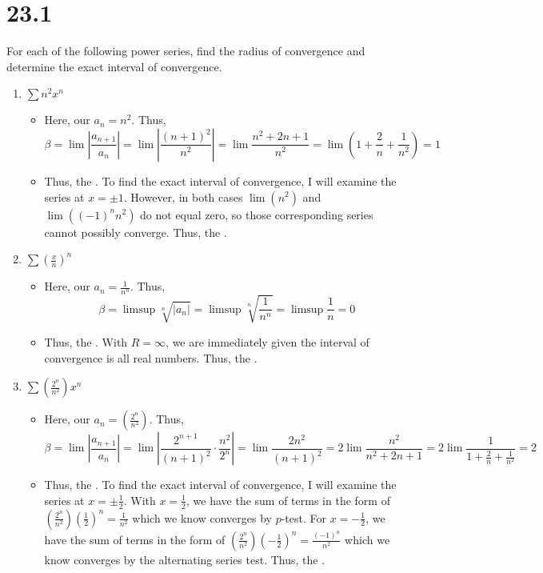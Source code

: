 \documentclass[10pt,a4paper]{article}
\theoremstyle{definition}
\begin{document}
\section*{23.1}
For each of the following power series, find the radius of convergence and determine the exact interval of convergence.
\begin{enumerate}[label = (\alph*)]
\item $\displaystyle \sum n^2x^n$
	\begin{itemize}
	\item Here, our $a_n = n^2$. Thus,
	\[\beta = \lim \left|\frac{a_{n+1}}{a_n}\right| = \lim \left|\frac{(n+1)^2}{n^2}\right| = \lim \frac{n^2 + 2n + 1}{n^2} = \lim \left(1 + \frac{2}{n} + \frac{1}{n^2}\right) = 1\]
	\item Thus, the . To find the exact interval of convergence, I will examine the series at $x = \pm 1$. However, in both cases $\lim(n^2)$ and $\lim((-1)^nn^2)$ do not equal zero, so those corresponding series cannot possibly converge. Thus, the .
	\end{itemize}
\item $\displaystyle \sum \left(\frac{x}{n}\right)^n$
	\begin{itemize}
	\item Here, our $a_n = \frac{1}{n^n}$. Thus,
	\[\beta = \limsup \sqrt[n]{|a_n|} = \limsup \sqrt[n]{\frac{1}{n^n}} = \limsup \frac{1}{n} = 0\]
	\item Thus, the . With $R = \infty$, we are immediately given the interval of convergence is all real numbers. Thus, the .
	\end{itemize}
\item $\displaystyle \sum \left(\frac{2^n}{n^2}\right)x^n$
	\begin{itemize}
	\item Here, our $\displaystyle a_n = \left(\frac{2^n}{n^2}\right)$. Thus,
	\[\beta = \lim \left|\frac{a_{n+1}}{a_n}\right| = \lim \left|\frac{2^{n+1}}{(n+1)^2} \cdot \frac{n^2}{2^n}\right| = \lim \frac{2n^2}{(n+1)^2} = 2\lim \frac{n^2}{n^2 + 2n + 1} = 2\lim \frac{1}{1 + \frac{2}{n} + \frac{1}{n^2}} = 2\]
	\item Thus, the . To find the exact interval of convergence, I will examine the series at $x = \pm \frac{1}{2}$. With $x = \frac{1}{2}$, we have the sum of terms in the form of $\displaystyle \left(\frac{2^n}{n^2}\right)\left(\frac{1}{2}\right)^n = \frac{1}{n^2}$ which we know converges by $p$-test. For $x = -\frac{1}{2}$, we have the sum of terms in the form of $\displaystyle \left(\frac{2^n}{n^2}\right)\left(-\frac{1}{2}\right)^n = \frac{(-1)^n}{n^2}$ which we know converges by the alternating series test. Thus, the .

\end{itemize}
\end{enumerate}
\end{document}
